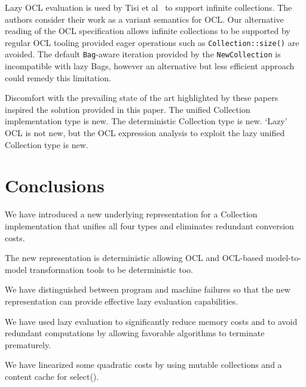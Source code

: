 \documentclass{llncs}
\begin{document}
Lazy OCL evaluation is used by Tisi et al~\cite{Lazy OCL} to support infinite collections. The authors consider their work as a variant semantics for OCL. Our alternative reading of the OCL specification allows infinite collections to be supported by regular OCL tooling provided eager operations such as \verb$Collection::size()$ are avoided. The default \verb$Bag$-aware iteration provided by the \verb$NewCollection$ is incompatible with lazy Bags, however an alternative but less efficient approach could remedy this limitation.   

Discomfort with the prevailing state of the art highlighted by these papers inspired the solution provided in this paper. The unified Collection implementation type is new. The deterministic Collection type is new. `Lazy' OCL is not new, but the OCL expression analysis to exploit the lazy unified Collection type is new.
%
\section{Conclusions}\label{Conclusions}
%
We have introduced a new underlying representation for a Collection implementation that unifies all four types and eliminates redundant conversion costs.

The new representation is deterministic allowing OCL and OCL-based model-to-model transformation tools to be deterministic too.

We have distinguished between program and machine failures so that the new representation can provide effective lazy evaluation capabilities.

We have used lazy evaluation to significantly reduce memory costs and to avoid redundant computations by allowing favorable algorithms to terminate prematurely.

We have linearized some quadratic costs by using mutable collections and a content cache for select().
  

\end{document}
